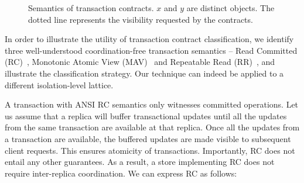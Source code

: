 \begin{figure}
\centering
{}
\hfill
{}
\hfill
{}
\caption{Semantics of transaction contracts. $x$ and $y$ are distinct objects.
The dotted line represents the visibility requested by the contracts.}
\label{fig:transaction}
\end{figure}

In order to illustrate the utility of transaction contract classification, we
identify three well-understood coordination-free transaction semantics -- Read
Committed (RC)~\cite{Berenson95}, Monotonic Atomic View (MAV)~\cite{BailisHAT}
and Repeatable Read (RR)~\cite{Berenson95}, and illustrate the classification
strategy. Our technique can indeed be applied to a different isolation-level
lattice.

A transaction with ANSI RC semantics only witnesses committed operations. Let
us assume that a replica will buffer transactional updates until all the
updates from the same transaction are available at that replica. Once all the
updates from a transaction are available, the buffered updates are made visible
to subsequent client requests. This ensures atomicity of transactions.
Importantly, RC does not entail any other guarantees. As a result, a store
implementing RC does not require inter-replica coordination. We can express RC
as follows:

